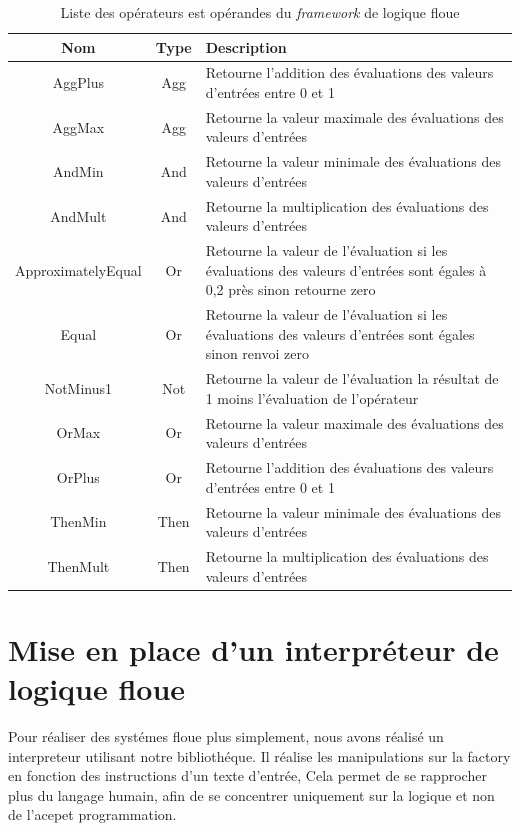 \documentclass[a4paper,11pt]{article}
\begin{document}
    \begin{table}[H]
        \caption{Liste des opérateurs est opérandes du \textit{framework} de logique floue}
        \label{tab:listing}

        \begin{center}
            \begin{tabular}{|c|c|M{10cm}|}
                \hline
                Nom & Type & Description \tabularnewline
                \hline
                AggPlus & Agg & Retourne l'addition des évaluations des valeurs d'entrées entre 0 et 1\tabularnewline
                \hline
                AggMax & Agg & Retourne la valeur maximale des évaluations des valeurs d'entrées\tabularnewline
                \hline
                AndMin & And & Retourne la valeur minimale des évaluations des valeurs d'entrées\tabularnewline
                \hline
                AndMult & And & Retourne la multiplication des évaluations des valeurs d'entrées\tabularnewline
                \hline
                ApproximatelyEqual & Or & Retourne la valeur de l'évaluation si les évaluations des valeurs d'entrées sont égales à 0,2 près sinon retourne zero\tabularnewline
                \hline
                Equal & Or & Retourne la valeur de l'évaluation si les évaluations des valeurs d'entrées sont égales sinon renvoi zero\tabularnewline
                \hline
                NotMinus1 & Not & Retourne la valeur de l'évaluation la résultat de 1 moins l'évaluation de l'opérateur\tabularnewline
                \hline
                OrMax & Or & Retourne la valeur maximale des évaluations des valeurs d'entrées\tabularnewline
                \hline
                OrPlus & Or & Retourne l'addition des évaluations des valeurs d'entrées entre 0 et 1\tabularnewline
                \hline
                ThenMin & Then & Retourne la valeur minimale des évaluations des valeurs d'entrées\tabularnewline
                \hline
                ThenMult & Then & Retourne la multiplication des évaluations des valeurs d'entrées\tabularnewline
                \hline
            \end{tabular}
        \end{center}
    \end{table}

    \section{Mise en place d'un interpréteur de logique floue}

    Pour réaliser des systémes floue plus simplement, nous avons réalisé un interpreteur utilisant notre bibliothéque.
    Il réalise les manipulations sur la factory en fonction des instructions d'un texte d'entrée,
    Cela permet de se rapprocher plus du langage humain, afin de se concentrer uniquement sur la logique et non de l'acepet programmation.
\end{document}
